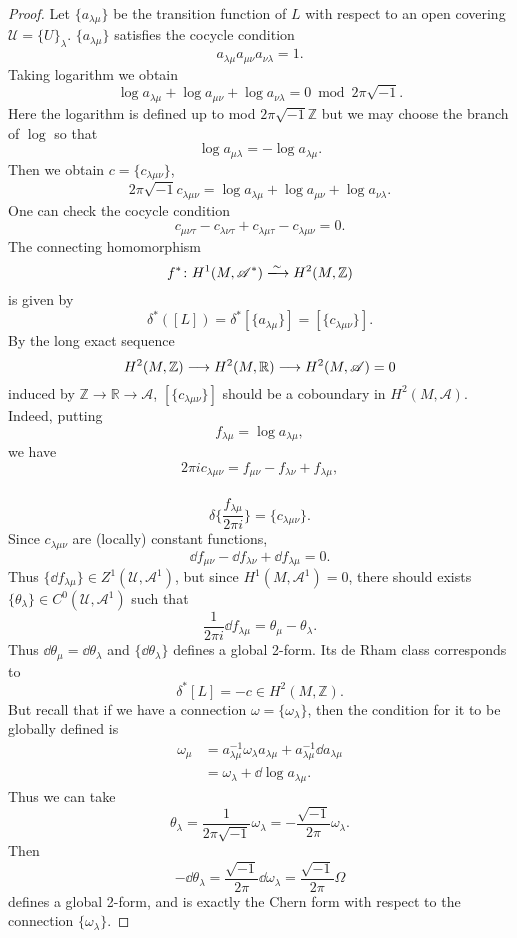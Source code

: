 \documentclass[12pt]{article}
\begin{document}
\begin{proof}
  Let \(\{a_{\lambda\mu}\}\) be the transition function of \(L\) with respect to an
  open covering \(\mathcal{U}=\{U\}_{\lambda}\). \(\{a_{\lambda\mu}\}\) satisfies the
  cocycle condition \[
    a_{\lambda\mu}a_{\mu\nu}a_{\nu\lambda}=1
  .\] Taking logarithm we obtain \[
    \log a_{\lambda\mu}+\log a_{\mu\nu}+\log a_{\nu\lambda}=0 \bmod{2\pi\sqrt{-1}}
  .\] Here the logarithm is defined up to mod \(2\pi\sqrt{-1}\mathbb{Z}\) but we may
  choose the branch of \(\log\) so that \[
    \log a_{\mu\lambda}=-\log a_{\lambda\mu}
  .\] Then we obtain \(c=\{c_{\lambda\mu\nu}\}\), \[
    2\pi\sqrt{-1}c_{\lambda\mu\nu}=\log a_{\lambda\mu}
    +\log a_{\mu\nu}+\log a_{\nu\lambda}
  .\] One can check the cocycle condition \[
    c_{\mu\nu\tau}-c_{\lambda\nu\tau}+c_{\lambda\mu\tau}-c_{\lambda\mu\nu}=0
  .\] The connecting homomorphism \[
    f^*\colon H^1(M,\mathscr{A}^*)\xrr{\sim}H^2(M,\mathbb{Z})
  \] is given by \[
  \delta^*([L])=\delta^*[\{a_{\lambda\mu}\}]=[\{c_{\lambda\mu\nu}\}]
  .\] By the long exact sequence \[
    H^2(M,\mathbb{Z})\longrightarrow H^2(M,\mathbb{R})\longrightarrow H^2(M,\mathscr{A})=0
  \] induced by \(\mathbb{Z}\to \mathbb{R}\to \mathscr{A}\),
  \([\{c_{\lambda\mu\nu}\}]\) should be a coboundary in \(H^2(M,\mathscr{A})\).
  Indeed, putting \[
    f_{\lambda\mu}=\log a_{\lambda\mu}
  ,\] we have \[
    2\pi i c_{\lambda\mu\nu}=f_{\mu\nu}-f_{\lambda\nu}+f_{\lambda\mu}
  ,\] \ie\ \[
    \delta\{\frac{f_{\lambda\mu}}{2\pi i}\}=\{c_{\lambda\mu\nu}\}
  .\] Since \(c_{\lambda\mu\nu}\) are (locally) constant functions, \[
    \dd{f_{\mu\nu}}-\dd{f_{\lambda\nu}}+\dd{f_{\lambda\mu}}=0
  .\] Thus \(\{\dd{f_{\lambda\mu}}\}\in Z^1(\mathcal{U},\mathscr{A}^1)\), but since 
  \(H^1(M,\mathscr{A}^1)=0\), there should exists \(\{\theta_\lambda\}\in
  C^0(\mathcal{U},\mathscr{A}^1)\) such that \[
    \frac{1}{2\pi i}\dd{f_{\lambda\mu}}=\theta_{\mu}-\theta_{\lambda}
  .\] Thus \(\dd{\theta_\mu}=\dd{\theta_\lambda}\) and \(\{\dd{\theta_\lambda}\}\)
  defines a global 2-form. Its de Rham class corresponds to \[
    \delta^*[L]=-c \in H^2(M,\mathbb{Z})
  .\] But recall that if we have a connection \(\omega=\{\omega_\lambda\}\), then
  the condition for it to be globally defined is 
  \begin{align*}
    \omega_\mu&=a_{\lambda\mu}^{-1}\omega_\lambda a_{\lambda\mu}+a_{\lambda\mu}^{-1}
    \dd{a_{\lambda\mu}} \\
    &=\omega_\lambda+\dd{\log a_{\lambda\mu}}
  .\end{align*}
  Thus we can take \[
    \theta_\lambda=\frac{1}{2\pi\sqrt{-1}}\omega_\lambda
    =-\frac{\sqrt{-1}}{2\pi}\omega_\lambda
  .\] Then \[
    -\dd{\theta_\lambda}=\frac{\sqrt{-1}}{2\pi}\dd{\omega_\lambda}=
    \frac{\sqrt{-1}}{2\pi}\Omega
  \] defines a global 2-form, and is exactly the Chern form with respect to the
  connection \(\{\omega_\lambda\}\).
\end{proof}
\end{document}
